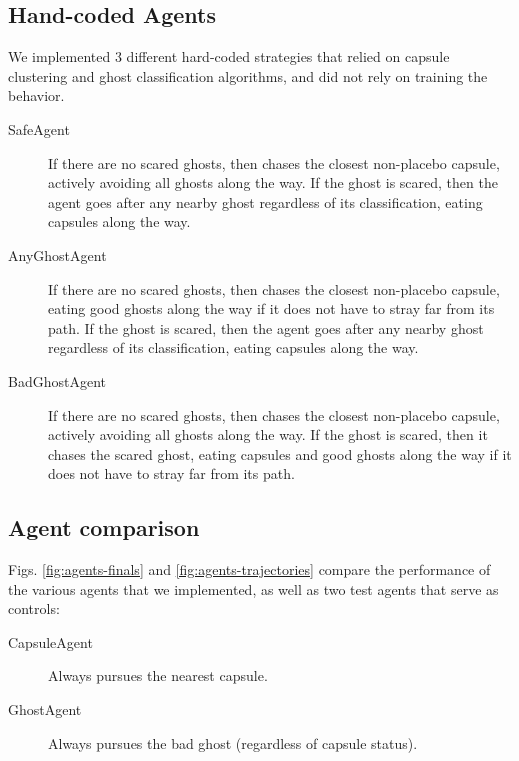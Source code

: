 \documentclass[11pt]{amsart}
\begin{document}
\subsection{Hand-coded Agents}

We implemented 3 different hard-coded strategies that relied on capsule clustering and ghost classification algorithms, and did not rely on training the behavior.
\begin{description}
	\item[SafeAgent] If there are no scared ghosts, then chases the closest non-placebo capsule, actively avoiding all ghosts along the way. If the ghost is scared, then the agent goes after any nearby ghost regardless of its classification, eating capsules along the way. 
	\item[AnyGhostAgent] If there are no scared ghosts, then chases the closest non-placebo capsule, eating good ghosts along the way if it does not have to stray far from its path. If the ghost is scared, then the agent goes after any nearby ghost regardless of its classification, eating capsules along the way. 
	\item[BadGhostAgent] If there are no scared ghosts, then chases the closest non-placebo capsule, actively avoiding all ghosts along the way. If the ghost is scared, then it chases the scared ghost, eating capsules and good ghosts along the way if it does not have to stray far from its path.
\end{description}

\subsection{Agent comparison}

Figs. \ref{fig:agents-finals} and \ref{fig:agents-trajectories} compare the performance of the various agents that we implemented, as well as two test agents that serve as controls:
\begin{description}
	\item[CapsuleAgent] Always pursues the nearest capsule.
	\item[GhostAgent] Always pursues the bad ghost (regardless of capsule status).
\end{description} 
\end{document}
